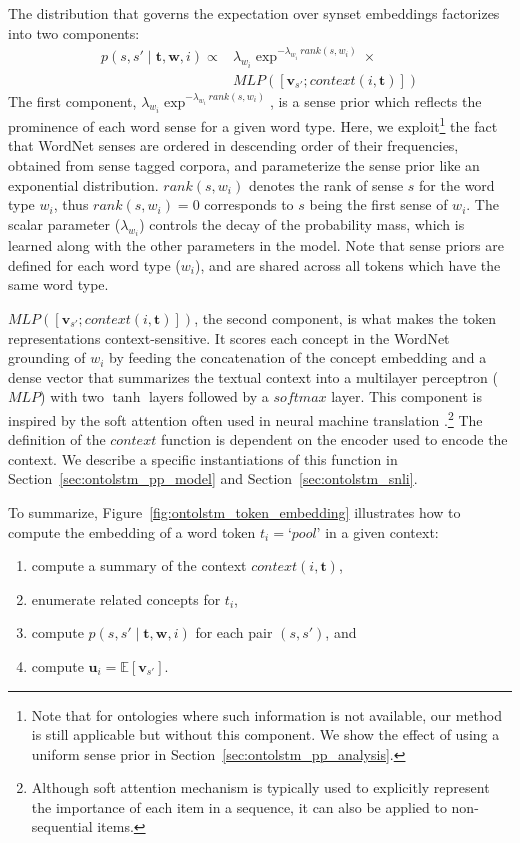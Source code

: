 The distribution that governs the expectation over synset embeddings factorizes
into two components: \begin{align} p(s, s' \mid \boldsymbol{t}, \boldsymbol{w},
	i) \propto& \lambda_{w_i} \exp^{-\lambda_{w_i} \  \textit{rank}(s, w_i)}
	\times \nonumber \\ &  \textit{MLP}( [\mathbf{v}_{s'};
\textit{context}(i, \boldsymbol{t})]) \label{eq:ontolstm_attention} \end{align}
The first component, $\lambda_{w_i} \exp^{-\lambda_{w_i} \  \textit{rank}(s,
w_i)}$, is a sense prior which reflects the prominence of each word sense for a
given word type. Here, we exploit\footnote{Note that for ontologies where such
information is not available, our method is still applicable but without this
component.  We show the effect of using a uniform sense prior in
Section~\ref{sec:ontolstm_pp_analysis}.} the fact that WordNet senses are
ordered in descending order of their frequencies, obtained from sense tagged
corpora, and parameterize the sense prior like an exponential distribution.
$rank(s, w_i)$ denotes the rank of sense $s$ for the word type $w_i$, thus
$rank(s, w_i)=0$ corresponds to $s$ being the first sense of $w_i$.  The scalar
parameter ($\lambda_{w_i}$) controls the decay of the probability mass, which is
learned along with the other parameters in the model. Note that sense priors are
defined for each word type ($w_i$), and are shared across all tokens which have
the same word type.

$\textit{MLP}( [\mathbf{v}_{s'}; \textit{context}(i, \boldsymbol{t})])$, the
second component, is what makes the token representations context-sensitive.  It
scores each concept in the WordNet grounding of $w_i$ by feeding the
concatenation of the concept embedding and a dense vector that summarizes the
textual context into a multilayer perceptron ($\textit{MLP}$) with two $\tanh$
layers followed by a $softmax$ layer.  This component is inspired by the soft
attention often used in neural machine translation
\citep{bahdanau:14}.\footnote{Although soft attention mechanism is typically
used to explicitly represent the importance of each item in a sequence, it can
also be applied to non-sequential items.} The definition of the
$\textit{context}$ function is dependent on the encoder used to encode the
context.  We describe a specific instantiations of this function in
Section~\ref{sec:ontolstm_pp_model} and Section~\ref{sec:ontolstm_snli}.

To summarize, Figure~\ref{fig:ontolstm_token_embedding} illustrates how to
compute the embedding of a word token $t_i=\textit{`pool'}$ in a given context:
\begin{enumerate} \item compute a summary of the context $\textit{context}(i,
			\boldsymbol{t})$, \item enumerate related concepts for
$t_i$, \item compute $p(s,s'\mid \boldsymbol{t}, \boldsymbol{w}, i)$ for each
pair $(s,s')$, and \item compute $\mathbf{u}_i = \mathbb{E}[\mathbf{v}_{s'}]$.
\end{enumerate}

